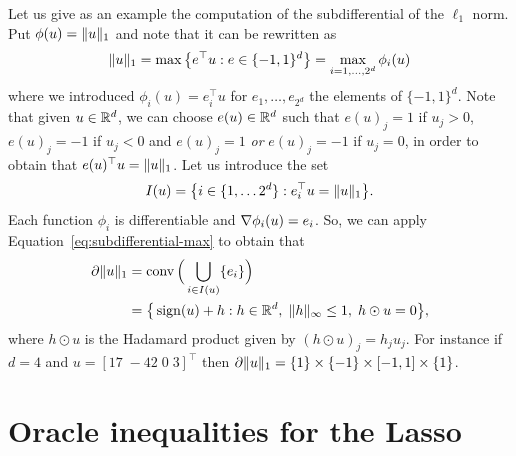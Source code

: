 Let us give as an example the computation of the subdifferential of the $\ell_1$ norm.
Put $\phi(u) = \| u \|_1$ and note that it can be rewritten as
\begin{equation*}
	\| u \|_1 = \max \big\{ e^\top u : e \in \{ -1, 1 \}^d \big\} = \max_{i=1, \ldots, 2^d} \phi_i(u)
\end{equation*}
where we introduced $\phi_i(u) = e_i^\top u$ for $e_1, \ldots, e_{2^d}$ the elements of $\{ -1, 1 \}^d$.
Note that given $u \in \mathbb R^d$, we can choose $e(u) \in \mathbb R^d$ such that $e(u)_j = 1$ if $u_j > 0$, $e(u)_j = -1$ if $u_j < 0$ and $e(u)_j = 1$ \emph{or} $e(u)_j = -1$ if $u_j = 0$, in order to obtain that $e(u)^\top u = \| u \|_1$.
Let us introduce the set
\begin{equation*}
	I(u) = \big\{ i \in \{ 1, \ldots 2^d \} : e_i^\top u = \| u \|_1 \big\}.
\end{equation*}
Each function $\phi_i$ is differentiable and $\nabla \phi_i(u) = e_i$. 
So, we can apply Equation~\eqref{eq:subdifferential-max} to obtain that
\begin{equation}
	\label{eq:subdifferential-l1}
	\begin{split}
	\partial \| u \|_1 &= \operatorname{conv}\Big( \bigcup_{i \in I(u)} \{ e_i \} \Big) \\
	&= \big\{ \operatorname{sign}(u) + h : h \in \mathbb R^d, \; \| h \|_\infty \leq 1, \; h \odot u = 0 
	\big\},
	\end{split}
\end{equation}
where $h \odot u$ is the Hadamard product given by $(h \odot u)_j = h_j u_j$.
For instance if $d = 4$ and $u = [17 \; -42 \; 0 \; 3]^\top$ then $\partial \| u \|_1 = \{ 1 \} \times \{ -1 \} \times [-1, 1] \times \{ 1 \}$.

\section{Oracle inequalities for the Lasso} %

